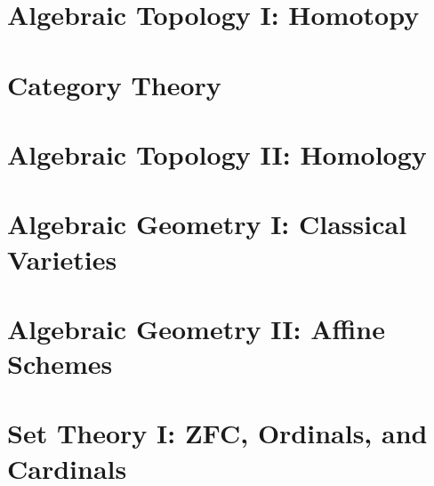\documentclass[11pt,twoside=semi,openright,numbers=noenddot,titlepage=false]{scrbook}
\begin{document}
\part{Algebraic Topology I: Homotopy}
\label{part:algtop1}
\parttoc



\part{Category Theory}
\label{part:cats}
\parttoc



\part{Algebraic Topology II: Homology}
\label{part:algtop2}
\parttoc






\part{Algebraic Geometry I: Classical Varieties}
\label{part:ag1}
\parttoc





\part{Algebraic Geometry II: Affine Schemes}
\label{part:ag2}
\parttoc







\part{Set Theory I: ZFC, Ordinals, and Cardinals}
\label{part:st1}
\parttoc




\end{document}
